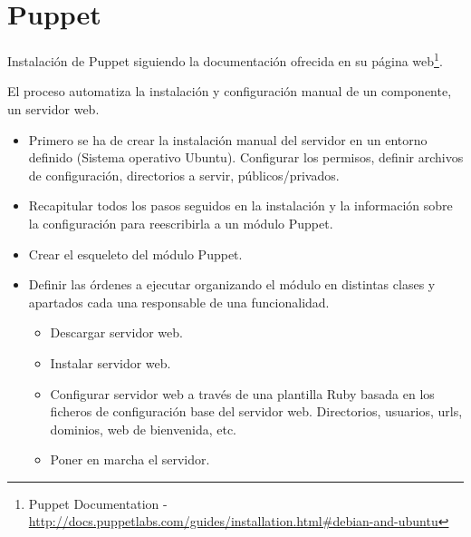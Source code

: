 %
% 

\chapter{Puppet}
\label{app:apendice-puppet}

\par Instalación de Puppet siguiendo la documentación ofrecida en su página web\footnote{Puppet Documentation - \url{http://docs.puppetlabs.com/guides/installation.html\#debian-and-ubuntu}}.

\par El proceso automatiza la instalación y configuración manual de un componente, un servidor web.

\begin{itemize}
	\item Primero se ha de crear la instalación manual del servidor en un entorno definido (Sistema operativo Ubuntu). Configurar los permisos, definir archivos de configuración, directorios a servir, públicos/privados.
	\item Recapitular todos los pasos seguidos en la instalación y la información sobre la configuración para reescribirla a un módulo Puppet.
	\item Crear el esqueleto del módulo Puppet.
	\item Definir las órdenes a ejecutar organizando el módulo en distintas clases y apartados cada una responsable de una funcionalidad.
	\begin{itemize}
	    \item Descargar servidor web.
	    \item Instalar servidor web.
	    \item Configurar servidor web a través de una plantilla Ruby basada en los ficheros de configuración base del servidor web. Directorios, usuarios, urls, dominios, web de bienvenida, etc.
	    \item Poner en marcha el servidor.
    \end{itemize}
\end{itemize}

